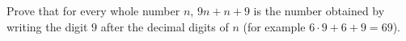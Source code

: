 Prove that for every whole number $n$, $9n+n+9$ is the number obtained by writing the digit $9$ after the decimal digits of $n$ (for example $6\cdot9+6+9=69$).
